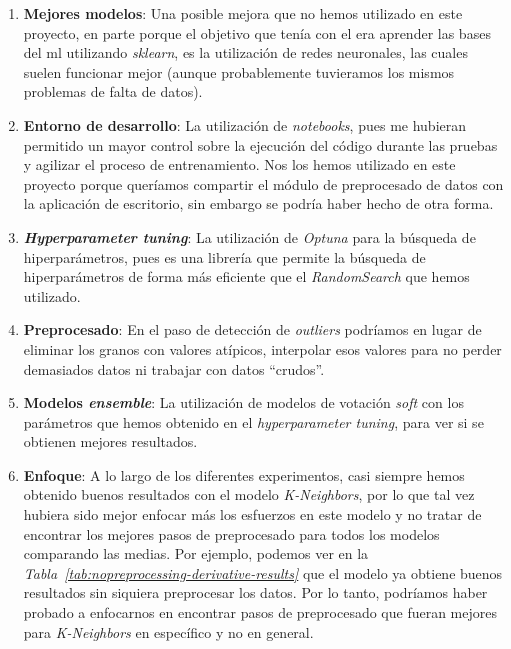\begin{enumerate}
    \item \textbf{Mejores modelos}: Una posible mejora que no hemos utilizado en este proyecto, en parte porque el objetivo que tenía con el era aprender las bases del \gls{ml} utilizando \textit{sklearn}, es la utilización de redes neuronales, las cuales suelen funcionar mejor (aunque probablemente tuvieramos los mismos problemas de falta de datos).
    \item \textbf{Entorno de desarrollo}: La utilización de \textit{notebooks}, pues me hubieran permitido un mayor control sobre la ejecución del código durante las pruebas y agilizar el proceso de entrenamiento. Nos los hemos utilizado en este proyecto porque queríamos compartir el módulo de preprocesado de datos con la aplicación de escritorio, sin embargo se podría haber hecho de otra forma.
    \item \textbf{\textit{Hyperparameter tuning}}: La utilización de \textit{Optuna} para la búsqueda de hiperparámetros, pues es una librería que permite la búsqueda de hiperparámetros de forma más eficiente que el \textit{RandomSearch} que hemos utilizado.
    \item \textbf{Preprocesado}: En el paso de detección de \textit{outliers} podríamos en lugar de eliminar los granos con valores atípicos, interpolar esos valores para no perder demasiados datos ni trabajar con datos ``crudos''.
    \item \textbf{Modelos \textit{ensemble}}: La utilización de modelos de votación \textit{soft} con los parámetros que hemos obtenido en el \textit{hyperparameter tuning}, para ver si se obtienen mejores resultados.
    \item \textbf{Enfoque}: A lo largo de los diferentes experimentos, casi siempre hemos obtenido buenos resultados con el modelo \textit{K-Neighbors}, por lo que tal vez hubiera sido mejor enfocar más los esfuerzos en este modelo y no tratar de encontrar los mejores pasos de preprocesado para todos los modelos comparando las medias. Por ejemplo, podemos ver en la \textit{Tabla\ \ref{tab:nopreprocessing-derivative-results}} que el modelo ya obtiene buenos resultados sin siquiera preprocesar los datos. Por lo tanto, podríamos haber probado a enfocarnos en encontrar pasos de preprocesado que fueran mejores para \textit{K-Neighbors} en específico y no en general.
\end{enumerate}

